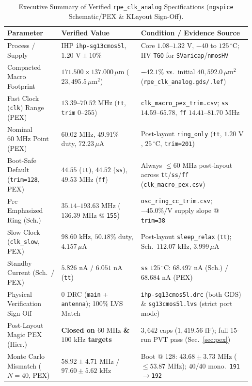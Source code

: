 \documentclass[10pt,a4paper]{article}
\begin{document}
\begin{table}[H]
\centering
\caption{Executive Summary of Verified \texttt{rpe\_clk\_analog} Specifications (\texttt{ngspice} Schematic/PEX \& KLayout Sign-Off).}
\label{tab:exec_summary}
\small
\begin{tabularx}{\textwidth}{@{}ll >{\raggedright\arraybackslash}X@{}}
\toprule
\textbf{Parameter} & \textbf{Verified Value} & \textbf{Condition / Evidence Source} \\
\midrule
Process / Supply & IHP \texttt{ihp-sg13cmos5l}, $1.20\text{ V} \pm 10\%$ & Core $1.08$--$1.32\text{ V}$, $-40$ to $125\,^\circ\text{C}$; HV \texttt{TGO} for \texttt{SVaricap}/\texttt{nmosHV} \\
Compacted Macro Footprint & $171.500 \times 137.000\,\mu\text{m}$ ($23{,}495.5\,\mu\text{m}^2$) & $-42.1\%$ vs.\ initial $40{,}592.0\,\mu\text{m}^2$ (\texttt{rpe\_clk\_analog.gds/.lef}) \\
Fast Clock (\texttt{clk}) Range (PEX) & $13.39$--$70.52\text{ MHz}$ (\texttt{tt}, \texttt{trim} $0$--$255$) & \texttt{clk\_macro\_pex\_trim.csv}; \texttt{ss} $14.59$--$65.78$, \texttt{ff} $14.41$--$81.70\text{ MHz}$ \\
Nominal $60\text{ MHz}$ Point (PEX) & $60.02\text{ MHz}$, $49.91\%$ duty, $72.23\,\mu\text{A}$ & Post-layout \texttt{ring\_only} (\texttt{tt}, $1.20\text{ V}$, $25\,^\circ\text{C}$, \texttt{trim=201}) \\
Boot-Safe Default (\texttt{trim=128}, PEX) & $44.55$ (\texttt{tt}), $44.52$ (\texttt{ss}), $49.53\text{ MHz}$ (\texttt{ff}) & Always $\le 60\text{ MHz}$ post-layout across \texttt{tt}/\texttt{ss}/\texttt{ff} (\texttt{clk\_macro\_pex.csv}) \\
Pre-Emphasized Ring (Sch.) & $35.14$--$193.63\text{ MHz}$ ($136.39\text{ MHz}$ @ \texttt{155}) & \texttt{osc\_ring\_cc\_trim.csv}; $-45.0\%/\text{V}$ supply slope @ \texttt{trim=38} \\
Slow Clock (\texttt{clk\_slow}, PEX) & $98.60\text{ kHz}$, $50.18\%$ duty, $4.157\,\mu\text{A}$ & Post-layout \texttt{sleep\_relax} (\texttt{tt}); Sch.\ $112.07\text{ kHz}$, $3.999\,\mu\text{A}$ \\
Standby Current (Sch.\ / PEX) & $5.826\text{ nA}$ / $6.051\text{ nA}$ (\texttt{tt}) & \texttt{ss} $125\,^\circ\text{C}$: $68.497\text{ nA}$ (Sch.) / $68.684\text{ nA}$ (PEX) \\
Physical Verification Sign-Off & $0$ DRC (\texttt{main} + \texttt{antenna}); 100\% LVS Match & \texttt{ihp-sg13cmos5l.drc} (both GDS) \& \texttt{sg13cmos5l.lvs} (strict port mode) \\
Post-Layout Magic PEX (Hier.) & \textbf{Closed on $60\text{ MHz}$ \& $100\text{ kHz}$ targets} & $3{,}642$ caps ($1{,}419.56\text{ fF}$); full 15-run PVT pass (Sec.~\ref{sec:pex}) \\
Monte Carlo Mismatch ($N=40$, PEX) & $58.92 \pm 4.71\text{ MHz}$ / $97.60 \pm 5.62\text{ kHz}$ & Boot @ 128: $43.68 \pm 3.73\text{ MHz}$ ($\le 53.87\text{ MHz}$); $40/40$ mono.\ \texttt{191}$\to$\texttt{192} \\
\bottomrule
\end{tabularx}
\end{table}
\end{document}

